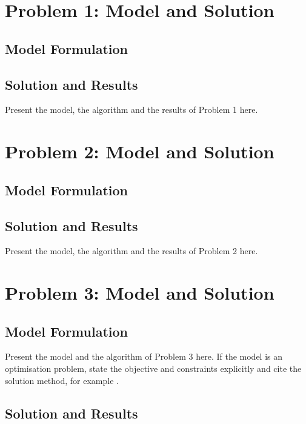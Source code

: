 \section{Problem 1: Model and Solution}

\subsection{Model Formulation}

\subsection{Solution and Results}

Present the model, the algorithm and the results of Problem 1 here.

\section{Problem 2: Model and Solution}

\subsection{Model Formulation}

\subsection{Solution and Results}

Present the model, the algorithm and the results of Problem 2 here.

\section{Problem 3: Model and Solution}

\subsection{Model Formulation}

Present the model and the algorithm of Problem 3 here. If the model is an
optimisation problem, state the objective and constraints explicitly and
cite the solution method, for example \citep{bertsekas1999nonlinear}.

\subsection{Solution and Results}

